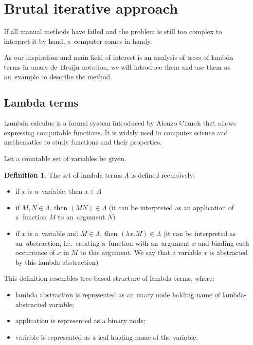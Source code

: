 \documentclass[final]{article}
\theoremstyle{definition}
\newtheorem{definition}{Definition}[subsection]
\theoremstyle{definition}
\theoremstyle{remark}
\begin{document}
\section{Brutal iterative approach}%
\label{sec:brutal_iterative_approach}

If all manual methods have failed and the problem is still too complex to interpret it by hand, a~computer comes in handy.

As our inspiration and main field of interest is an analysis of trees of lambda terms in unary de~Bruijn notation, we will introduce them and use them as an~example to describe the method.

\subsection{Lambda terms}%
\label{sub:lambda_terms}

Lambda calculus is a formal system introduced by Alonzo Church that allows expressing computable functions. It is widely used in computer science and mathematics to study functions and their properties.

Let a countable set of variables be given.

\begin{definition}
    The set of lambda terms \(\Lambda\) is defined recursively:
    \begin{itemize}
        \item if \(x\) is a~variable, then \(x \in \Lambda\)
        \item if \(M, N \in \Lambda\), then \((M N) \in \Lambda\) (it can be interpreted as an application of a~function \(M\) to an~argument \(N\))
        \item if \(x\) is a~variable and \(M \in \Lambda\), then \((\lambda x. M) \in \Lambda\) (it can be interpreted as an~abstraction, i.e.~creating a~function with an~argument \(x\) and binding each occurrence of \(x\) in \(M\) to this argument. We say that a variable \(x\) is abstracted by this lambda-abstraction)
    \end{itemize}
\end{definition}

This definition resembles tree-based structure of lambda terms, where:
\begin{itemize}
    \item lambda abstraction is represented as an unary node holding name of lambda-abstracted variable;
    \item application is represented as a binary node;
    \item variable is represented as a leaf holding name of the variable.
\end{itemize}
\end{document}
